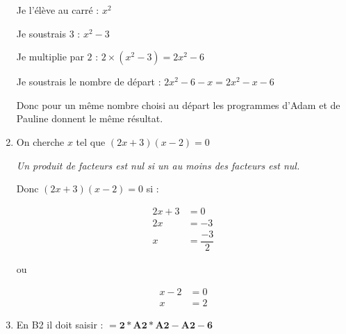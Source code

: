 \begin{enumerate}
	Je l’élève au carré : $x^2$
	
	Je soustrais $3$ : $x^2-3$
	
	Je multiplie par $2$ : $2\times (x^2-3) = 2x^2-6$
	
	Je soustrais le nombre de départ : $2x^2-6-x= 2x^2-x-6$
	
Donc pour un même nombre choisi au départ les programmes d’Adam et de Pauline donnent le même résultat.

\item On cherche $x$ tel que $(2x+3)(x-2)=0$

\textit{Un produit de facteurs est nul si un au moins des facteurs est nul.}

Donc $(2x+3)(x-2)=0$ si :
\begin{minipage}{8cm}
\begin{align*}
2x+3 &= 0\\
2x &=-3\\
x &= \dfrac{-3}{2}
\end{align*}
\end{minipage}
\begin{minipage}{1cm}
ou
\end{minipage}
\begin{minipage}{8cm}
\begin{align*}
x-2 &=0\\
x &= 2
\end{align*}
\end{minipage}


\item En B2 il doit saisir : $\mathbf{= 2*A2*A2 - A2 - 6}$
\end{enumerate}